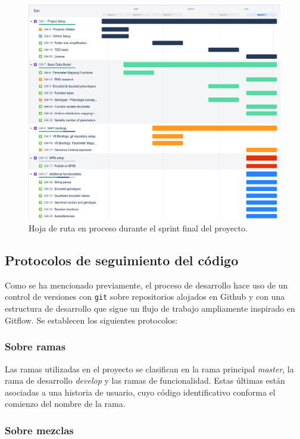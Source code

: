\begin{figure}
    \centering
    \centerline{
    \includegraphics[width=0.8\paperwidth]{imagenes/road_map_03_07.png}
    }
    \caption{Hoja de ruta en proceso durante el sprint final del proyecto.}
    \label{fig:roadmap}
\end{figure}


\subsection{Protocolos de seguimiento del código}

Como se ha mencionado previamente, el proceso de desarrollo hace uso de un control de versiones con \verb|git| sobre repositorios alojados en Github y con una estructura de desarrollo que sigue un flujo de trabajo ampliamente inspirado en Gitflow. Se establecen los siguientes protocolos:

\subsubsection{Sobre ramas}

Las ramas utilizadas en el proyecto se clasifican en la rama principal \textit{master}, la rama de desarrollo \textit{develop} y las ramas de funcionalidad. Estas últimas están asociadas a una historia de usuario, cuyo código identificativo conforma el comienzo del nombre de la rama.

\subsubsection{Sobre mezclas}

